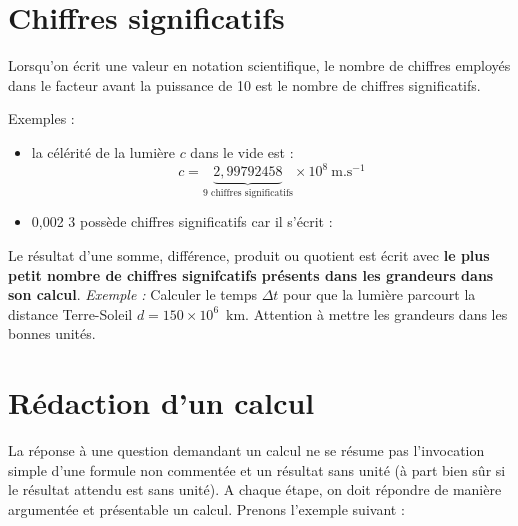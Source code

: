 \section{Chiffres significatifs}

\begin{tcolorbox}
[colback=green!5!white,colframe=green!75!black,title=\textbf{Chiffre significatif}]
Lorsqu’on écrit une valeur en notation scientifique, le nombre de chiffres employés dans le facteur avant la puissance de 10 est le nombre de chiffres significatifs.\\
\end{tcolorbox}
Exemples : 
\begin{itemize}
    \item la célérité de la lumière $c$ dans le vide est :
\begin{equation*}
    c =\underbrace{2,99 792458}_{\text{9 chiffres significatifs}}\times 10^8~\text{m.s}^{-1}
\end{equation*}
\item 0,002 3 possède  chiffres significatifs car il s'écrit : 
\end{itemize}

\begin{tcolorbox}[colback=red!5!white,colframe=red!75!black,title=Règles à retenir sur les chiffres significatifs]
Le résultat d'une somme, différence, produit ou quotient est écrit avec \textbf{le plus petit nombre de chiffres signifcatifs présents dans les grandeurs dans son calcul}.
\newline
\newline
\textit{Exemple : } Calculer le temps $\Delta t$ pour que la lumière parcourt la distance Terre-Soleil $d=150\times 10^{6}$~km. Attention à mettre les grandeurs dans les bonnes unités.
\newline
\newline
\newline
\newline
\newline
\newline
\end{tcolorbox}


\section{Rédaction d'un calcul}
La réponse à une question demandant un calcul ne se résume pas l'invocation simple d'une formule non commentée et un résultat sans unité (à part bien sûr si le résultat attendu est sans unité). A chaque étape, on doit répondre de manière argumentée et présentable un calcul. Prenons l'exemple suivant : 

